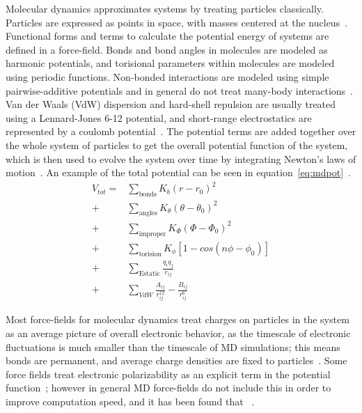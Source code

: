 \documentclass[12pt,openany,final]{book}
\begin{document}
Molecular dynamics approximates systems by treating particles classically. Particles are expressed as points in space, 
with masses centered at the nucleus~\cite{pandit:2008:simulationtextbook}.
Functional forms and terms to calculate the potential energy of systems are defined in a force-field.
Bonds and bond angles in molecules are modeled as harmonic potentials, and torisional parameters within molecules are modeled
using periodic functions. Non-bonded interactions
are modeled using simple pairwise-additive potentials and in general do not treat many-body interactions~\cite{tieleman:1997:memsim,pandit:2008:simulationtextbook}. 
Van der Waals (VdW) dispersion and hard-shell repulsion are usually treated using a Lennard-Jones 6-12 potential,
and short-range electrostatics are represented by a coulomb potential~\cite{tieleman:1997:memsim,pandit:2008:simulationtextbook}.
The potential terms are added together over the whole system of particles
to get the overall potential function of the system, which is then used to evolve the system over time by integrating
Newton's laws of motion~\cite{frenkel:2001:molsimbook}. An example of the total potential can be seen in equation~\ref{eq:mdpot}~\cite{pandit:2008:simulationtextbook}.
\begin{equation}
    \label{eq:mdpot}
\begin{aligned}
    V_{tot}=&\sum_{\text{bonds}}K_b(r-r_0)^2 \\+& \sum_{\text{angles}}K_{\theta}(\theta - \theta_0)^2 \\+& \sum_{\text{improper}}K_\Phi(\Phi-\Phi_0)^2
    \\+& \sum_{\text{torision}}K_\phi[1-cos(n\phi-\phi_0)] \\+& \sum_{\text{Estatic}}\frac{q_iq_j}{r_{ij}} \\+& \sum_{VdW}\frac{A_{ij}}{r^{12}_{ij}}-\frac{B_{ij}}{r^6_{ij}}
\end{aligned}
\end{equation}

Most force-fields for molecular dynamics treat charges on particles in the system as an average picture of overall electronic behavior, as the
timescale of electronic fluctuations is much smaller than the timescale of MD simulations; this means bonds are permanent,
and average charge densities are fixed to particles~\cite{pandit:2008:simulationtextbook}.
Some force fields treat electronic polarizability as an explicit term in the potential function~\cite{li:2017:drude,ponder:2010:current}; however in general
MD force-fields do not include this in order to improve computation speed, and it has been found that
~\cite{pandit:2008:simulationtextbook}.
\end{document}
